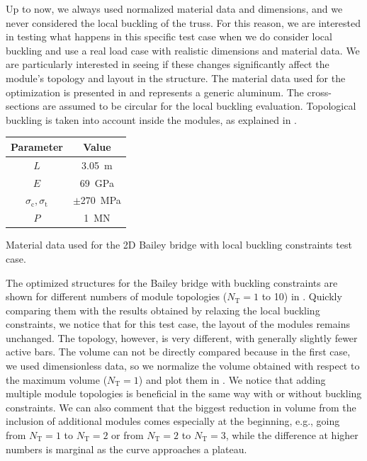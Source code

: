 Up to now, we always used normalized material data and dimensions, and we never considered the local buckling of the truss. For this reason, we are interested in testing what happens in this specific test case when we do consider local buckling and use a real load case with realistic dimensions and material data. We are particularly interested in seeing if these changes significantly affect the module's topology and layout in the structure. The material data used for the optimization is presented in  and represents a generic aluminum. The cross-sections are assumed to be circular for the local buckling evaluation. Topological buckling is taken into account inside the modules, as explained in .

\begin{margintable}
    \small
    \centering
    \begin{tabular}{cc}
    \toprule
    \textbf{Parameter}        & \textbf{Value} \\ \midrule
    $L$              & \qty{3.05}{m}     \\
    $E$              & \qty{69}{GPa}     \\
    $\sigma_\text{c}, \sigma_\text{t}$ & $\pm $\qty{270}{MPa} \\
    $P$              & \qty{1}{MN}   \\
    \bottomrule
    \end{tabular}
    \caption{Material data used for the 2D Bailey bridge with local buckling constraints test case.}
    \label{tab:06_modular_tug_buck}
\end{margintable}

The optimized structures for the Bailey bridge with buckling constraints are shown for different numbers of module topologies ($N_\text{T}=1$ to 10) in . Quickly comparing them with the results obtained by relaxing the local buckling constraints, we notice that for this test case, the layout of the modules remains unchanged. The topology, however, is very different, with generally slightly fewer active bars. The volume can not be directly compared because in the first case, we used dimensionless data, so we normalize the volume obtained with respect to the maximum volume ($N_\text{T}=1$) and plot them in . We notice that adding multiple module topologies is beneficial in the same way with or without buckling constraints. We can also comment that the biggest reduction in volume from the inclusion of additional modules comes especially at the beginning, e.g., going from $N_\text{T}=1$ to $N_\text{T}=2$ or from $N_\text{T}=2$ to $N_\text{T}=3$, while the difference at higher numbers is marginal as the curve approaches a plateau.


